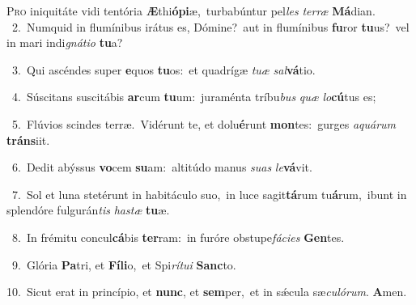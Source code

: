 \lettrine{\initial\textcolor{\initialcolor}{P}}{ro} iniquitáte vidi tentória \textbf{Æ}\-thi\-\textbf{ó}\-\textbf{pi}æ,~\star turbabúntur pel\textit{les} \textit{ter}\-\textit{ræ} \textbf{Má}\-dian.\\
{\numbfont\textcolor{\numbcolor}{~2.}}~Numquid in flumínibus irátus es, Dómine?~\dagger aut in flumínibus \textbf{fu}\-ror \textbf{tu}\-us?~\star vel in mari indi\-\textit{gná}\-\textit{ti}\textit{o} \textbf{tu}\-a?\par
{\numbfont\textcolor{\numbcolor}{~3.}}~Qui ascéndes super \textbf{e}\-quos \textbf{tu}\-os:~\star et quadrígæ \textit{tu}\-\textit{æ} \textit{sal}\-\textbf{vá}tio.\par
{\numbfont\textcolor{\numbcolor}{~4.}}~Súscitans suscitábis \textbf{ar}\-cum \textbf{tu}\-um:~\star juraménta tríbu\textit{bus} \textit{quæ} \textit{lo}\-\textbf{cú}tus es;\par
{\numbfont\textcolor{\numbcolor}{~5.}}~Flúvios scindes terræ.~\dagger Vidérunt te, et dolu\-\textbf{é}\-runt \textbf{mon}\-tes:~\star gurges \textit{a}\-\textit{quá}\textit{rum} \textbf{tráns}\-iit.\par
{\numbfont\textcolor{\numbcolor}{~6.}}~Dedit abýssus \textbf{vo}\-cem \textbf{su}\-am:~\star altitúdo manus \textit{su}\-\textit{as} \textit{le}\-\textbf{vá}vit.\par
{\numbfont\textcolor{\numbcolor}{~7.}}~Sol et luna stetérunt in habitáculo suo,~\dagger in luce sagit\-\textbf{tá}\-rum tu\-\textbf{á}\-rum,~\star ibunt in splendóre fulgurán\textit{tis} \textit{has}\-\textit{tæ} \textbf{tu}\-æ.\par
{\numbfont\textcolor{\numbcolor}{~8.}}~In frémitu concul\-\textbf{cá}\-bis \textbf{ter}\-ram:~\star in furóre obstupe\-\textit{fá}\-\textit{ci}\textit{es} \textbf{Gen}\-tes.\par
{\numbfont\textcolor{\numbcolor}{~9.}}~Glória \textbf{Pa}\-tri, et \textbf{Fí}\-\textbf{li}o,~\star et Spi\-\textit{rí}\-\textit{tu}\textit{i} \textbf{Sanc}\-to.\par
{\numbfont\textcolor{\numbcolor}{10.}}~Sicut erat in princípio, et \textbf{nunc}\-, et \textbf{sem}\-per,~\star et in sǽcula sæ\-\textit{cu}\-\textit{ló}\textit{rum}. \textbf{A}\-men.\par
